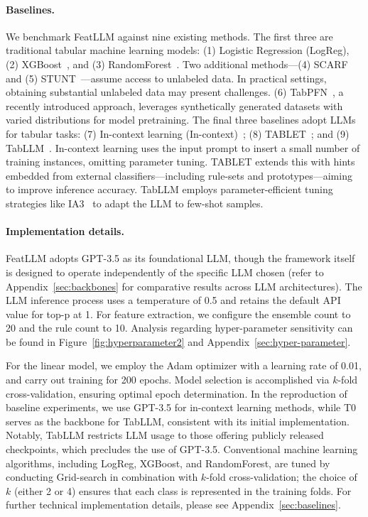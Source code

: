 \vspace*{-0.12in}
\paragraph{Baselines.}
We benchmark \textsf{FeatLLM} against nine existing methods. The first three are traditional tabular machine learning models: (1) Logistic Regression (LogReg), (2) XGBoost~\cite{chen2016xgboost}, and (3) RandomForest~\cite{ho1995random}. Two additional methods—(4) SCARF~\cite{bahri2022scarf} and (5) STUNT~\cite{nam2023stunt}—assume access to unlabeled data. In practical settings, obtaining substantial unlabeled data may present challenges. (6) TabPFN~\cite{hollmann2022tabpfn}, a recently introduced approach, leverages synthetically generated datasets with varied distributions for model pretraining. The final three baselines adopt LLMs for tabular tasks: (7) In-context learning (In-context)~\cite{wei2022emergent}; (8) TABLET~\cite{slack2023tablet}; and (9) TabLLM~\cite{hegselmann2023tabllm}. In-context learning uses the input prompt to insert a small number of training instances, omitting parameter tuning. TABLET extends this with hints embedded from external classifiers—including rule-sets and prototypes—aiming to improve inference accuracy. TabLLM employs parameter-efficient tuning strategies like IA3~\cite{liu2022few} to adapt the LLM to few-shot samples.

\vspace*{-0.12in}
\paragraph{Implementation details.}
\textsf{FeatLLM} adopts GPT-3.5 as its foundational LLM, though the framework itself is designed to operate independently of the specific LLM chosen (refer to Appendix~\ref{sec:backbones} for comparative results across LLM architectures). The LLM inference process uses a temperature of 0.5 and retains the default API value for top-p at 1. For feature extraction, we configure the ensemble count to 20 and the rule count to 10. Analysis regarding hyper-parameter sensitivity can be found in Figure~\ref{fig:hyperparameter2} and Appendix~\ref{sec:hyper-parameter}. 

For the linear model, we employ the Adam optimizer with a learning rate of 0.01, and carry out training for 200 epochs. Model selection is accomplished via $k$-fold cross-validation, ensuring optimal epoch determination. In the reproduction of baseline experiments, we use GPT-3.5 for in-context learning methods, while T0~\cite{sanh2022multitask} serves as the backbone for TabLLM, consistent with its initial implementation. Notably, TabLLM restricts LLM usage to those offering publicly released checkpoints, which precludes the use of GPT-3.5. Conventional machine learning algorithms, including LogReg, XGBoost, and RandomForest, are tuned by conducting Grid-search in combination with $k$-fold cross-validation; the choice of $k$ (either 2 or 4) ensures that each class is represented in the training folds. For further technical implementation details, please see Appendix~\ref{sec:baselines}.

